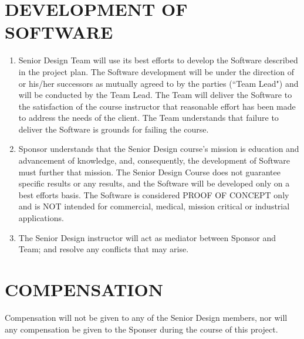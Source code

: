 \documentclass[11pt]{article}
\begin{document}
\section{DEVELOPMENT OF SOFTWARE }
\begin{enumerate}  \itemsep4pt \parskip0pt 
\item  Senior Design Team will use its best efforts to develop the Software described in the project plan. The Software development will be under the direction of  or his/her successors as mutually agreed to by the parties (``Team Lead") and will be conducted by the Team Lead.  The Team will deliver the Software to the satisfaction of the course instructor that reasonable effort has been made to address the needs of the client.  The Team understands that failure to deliver the Software is grounds for failing the course. 

\item  Sponsor understands that the Senior Design course's mission is education and advancement of knowledge, and, consequently, the development of Software must further that mission. The Senior Design Course does not guarantee specific results or any results, and the Software will be developed only on a best efforts basis.  The Software is considered PROOF OF CONCEPT only and is NOT intended for commercial, medical, mission critical or industrial applications.

\item  The Senior Design instructor will act as mediator between Sponsor and Team; and resolve any conflicts that may arise.
\end{enumerate}

\section{COMPENSATION}

Compensation will not be given to any of the Senior Design members, nor will any compensation be given to the Sponser during the course of this project. 
\end{document}
